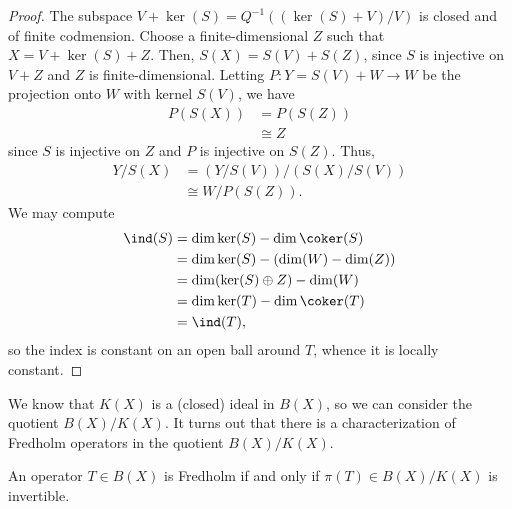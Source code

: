 \documentclass[10pt]{mypackage}
\begin{document}
\begin{proof}
  The subspace $V + \ker(S) = Q^{-1}\left( \left( \ker(S) + V \right)/V \right)$ is closed and of finite codmension. Choose a finite-dimensional $Z$ such that $X = V + \ker(S) + Z$. Then, $S(X) = S(V) + S(Z)$, since $S$ is injective on $V + Z$ and $Z$ is finite-dimensional. Letting $P\colon Y = S(V) + W \rightarrow W$ be the projection onto $W$ with kernel $S(V)$, we have
  \begin{align*}
    P(S(X)) &= P(S(Z))\\
            &\cong Z
  \end{align*}
  since $S$ is injective on $Z$ and $P$ is injective on $S(Z)$. Thus,
  \begin{align*}
    Y/S(X) &= \left( Y/S(V) \right)/\left( S(X)/S(V) \right)\\
           &\cong W/P(S(Z)).
  \end{align*}
  We may compute
  \begin{align*}
    \ind(S) &= \dim\ker(S) - \dim\coker(S)\\
            &= \dim\ker(S) - (\dim(W) - \dim(Z))\\
            &= \dim(\ker(S) \oplus Z) - \dim(W)\\
            &= \dim\ker(T) - \dim\coker(T)\\
            &= \ind(T),
  \end{align*}
  so the index is constant on an open ball around $T$, whence it is locally constant.
\end{proof}
We know that $K(X)$ is a (closed) ideal in $B(X)$, so we can consider the quotient $B(X)/K(X)$. It turns out that there is a characterization of Fredholm operators in the quotient $B(X)/K(X)$.
\begin{theorem}[Atkinson]
  An operator $T\in B(X)$ is Fredholm if and only if $ \pi(T)\in B(X)/K(X) $ is invertible.
\end{theorem}
\end{document}
